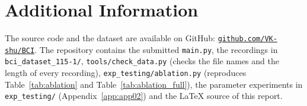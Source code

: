 \section{Additional Information}\label{app:app01}
The source code and the dataset are available on GitHub: \href{https://github.com/VK-shu/BCI}{\texttt{github.com/VK-shu/BCI}}. The repository contains the submitted \texttt{main.py}, the recordings in \texttt{bci\_dataset\_115-1/}, \texttt{tools/check\_data.py} (checks the file names and the length of every recording), \texttt{exp\_testing/ablation.py} (reproduces Table~\ref{tab:ablation} and Table~\ref{tab:ablation_full}), the parameter experiments in \texttt{exp\_testing/} (Appendix~\ref{app:app02}) and the \LaTeX{} source of this report.
